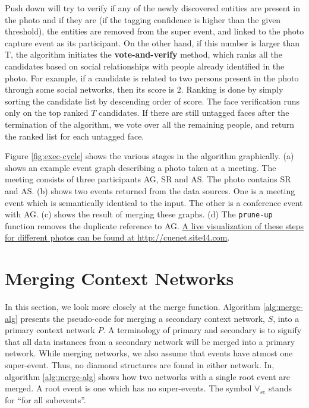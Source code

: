 Push down will try to verify if any of the newly discovered entities are present in the photo and if they are (if the tagging confidence is higher than the given threshold), the entities are removed from the super event, and linked to the photo capture event as its participant. On the other hand, if this number is larger than T, the algorithm initiates the \textbf{vote-and-verify} method, which ranks all the candidates based on social relationships with people already identified in the photo. For example, if a candidate is related to two persons present in the photo through some social networks, then its score is 2. Ranking is done by simply sorting the candidate list by descending order of score. The face verification runs only on the top ranked $T$ candidates. If there are still untagged faces after the termination of the algorithm, we vote over all the remaining people, and return the ranked list for each untagged face.

Figure \ref{fig:exec-cycle} shows the various stages in the algorithm graphically. (a) shows an example event graph describing a photo taken at a meeting. The meeting consists of three participants AG, SR and AS. The photo contains SR and AS. (b) shows two events returned from the data sources. One is a meeting event which is semantically identical to the input. The other is a conference event with AG. (c) shows the result of merging these graphs. (d) The \texttt{prune-up} function removes the duplicate reference to AG. \underline{A live visualization of these steps for different photos can be found at \href{http://cuenet.site44.com/}{http://cuenet.site44.com}}.

\section{Merging Context Networks}
In this section, we look more closely at the merge function. Algorithm \ref{alg:merge-alg} presents the pseudo-code for merging a secondary context network, $S$, into a primary context network $P$. A terminology of primary and secondary is to signify that all data instances from a secondary network will be merged into a primary network. While merging networks, we also assume that events have atmost one super-event. Thus, no diamond structures are found in either network. In, algorithm \ref{alg:merge-alg} shows how two networks with a single root event are merged. A root event is one which has no super-events. The symbol $\forall_{se}$ stands for ``for all subevents''.

